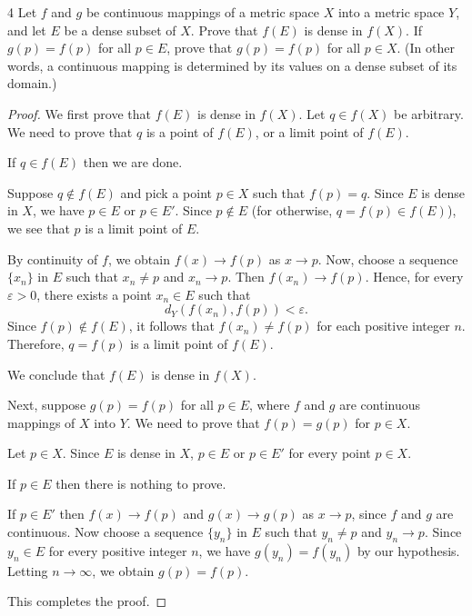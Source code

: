 \begin{exercise}{4}
Let $f$ and $g$ be continuous mappings of a metric space $X$ into a metric space $Y$, and let $E$ be a dense subset of $X$.
Prove that $f(E)$ is dense in $f(X)$.
If $g(p)=f(p)$ for all $p \in E$, prove that $g(p)=f(p)$ for all $p \in X$.
(In other words, a continuous mapping is determined by its values on a dense subset of its domain.)
\end{exercise}
\begin{proof}
We first prove that $f(E)$ is dense in $f(X)$.
Let $q \in f(X)$ be arbitrary.
We need to prove that $q$ is a point of $f(E)$, or a limit point of $f(E)$.

If $q \in f(E)$ then we are done.

Suppose $q \notin f(E)$ and pick a point $p \in X$ such that $f(p)=q$.
Since $E$ is dense in $X$, we have $p \in E$ or $p \in E'$.
Since $p \notin E$ (for otherwise, $q=f(p) \in f(E)$), we see that $p$ is a limit point of $E$.

By continuity of $f$, we obtain $f(x) \to f(p)$ as $x \to p$.
Now, choose a sequence $\{x_n\}$ in $E$ such that $x_n \neq p$ and $x_n \to p$.
Then $f(x_n) \to f(p)$.
Hence, for every $\varepsilon>0$, there exists a point $x_n \in E$ such that 
\[
d_Y(f(x_n),f(p))<\varepsilon.
\]
Since $f(p) \notin f(E)$, it follows that $f(x_n) \neq f(p)$ for each positive integer $n$.
Therefore, $q=f(p)$ is a limit point of $f(E)$.

We conclude that $f(E)$ is dense in $f(X)$.

Next, suppose $g(p)=f(p)$ for all $p \in E$, where $f$ and $g$ are continuous mappings of $X$ into $Y$.
We need to prove that $f(p)=g(p)$ for $p \in X$.

Let $p \in X$.
Since $E$ is dense in $X$, $p \in E$ or $p \in E'$ for every point $p \in X$.

If $p \in E$ then there is nothing to prove.

If $p \in E'$ then $f(x) \to f(p)$ and $g(x) \to g(p)$ as $x \to p$, since $f$ and $g$ are continuous.
Now choose a sequence $\{y_n\}$ in $E$ such that $y_n \neq p$ and $y_n \to p$.
Since $y_n \in E$ for every positive integer $n$, we have $g(y_n)=f(y_n)$ by our hypothesis.
Letting $n \to \infty$, we obtain $g(p)=f(p)$.

This completes the proof.
\end{proof}